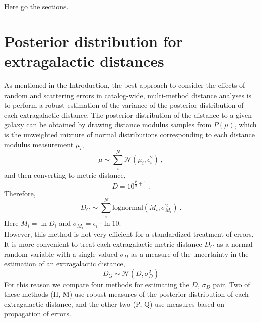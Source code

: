 \documentclass[a4paper,fleqn,usenatbib]{mnras}
\begin{document}

Here go the sections.






\section{Posterior distribution for extragalactic distances}
\label{sec:post} %
 
As mentioned in the Introduction, the best approach to consider the effects of random and scattering errors in catalog-wide, multi-method distance analyses is to perform a robust estimation of the variance of the posterior distribution of each extragalactic distance. The posterior distribution of the distance to a given galaxy can be obtained by drawing distance modulus samples from $P(\mu)$, which is the unweighted mixture of normal distributions corresponding to each distance modulus measurement $\mu_i$,
\[\mu\sim\sum_i^N \mathcal{N}(\mu_i,\epsilon_i^2)\ ,\]
and then converting to metric distance,
\[D=10^{\frac{\mu}{5}+1}\ .\]
Therefore,
\[D_G\sim\sum_i^N\mathrm{lognormal}(M_i,\sigma_{M_i}^2)\ .\]
Here $M_i=\ln D_i$ and $\sigma_{M_i}=\epsilon_i\cdot\ln10$.\\

However, this method is not very efficient for a standardized treatment of errors. It is more convenient to treat each extragalactic metric distance $D_G$ as a normal random variable with a single-valued $\sigma_D$ as a measure of the uncertainty in the estimation of an extragalactic distance,
\[D_G\sim \mathcal{N}(D,\sigma_D^2)\]
For this reason we compare four methods for estimating the $D,\,\sigma_D$ pair. Two of these methods (H, M) use robust measures of the posterior distribution of each extragalactic distance, and the other two (P, Q) use measures based on propagation of errors.
\end{document}

